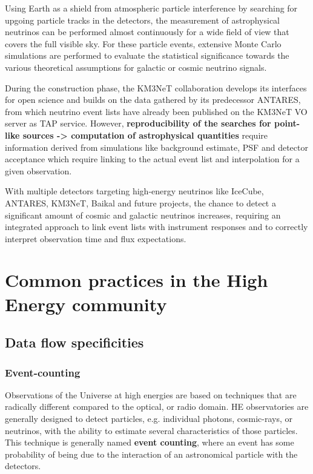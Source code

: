 \documentclass[11pt,a4paper]{ivoa}
\begin{document}
Using Earth as a shield from atmospheric particle interference by searching for upgoing particle tracks in the detectors,
the measurement of astrophysical neutrinos can be performed almost continuously for a wide field of view that covers the
full visible sky. For these particle events, extensive Monte Carlo simulations are performed to evaluate the
statistical significance towards the various theoretical assumptions for galactic or cosmic neutrino signals.

During the construction phase, the KM3NeT collaboration develops its interfaces for open science and builds on the data
gathered by its predecessor ANTARES, from which neutrino event lists have already been published on the KM3NeT VO server
as TAP service. However, {\bf reproducibility of the searches for point-like sources -> computation of astrophysical quantities}
require information derived from  simulations like background estimate, PSF and detector acceptance which require linking
to the actual event list and interpolation for a given observation.

With multiple detectors targeting high-energy neutrinos like IceCube, ANTARES, KM3NeT, Baikal and future projects, the
chance to detect a significant amount of cosmic and galactic neutrinos increases, requiring an integrated approach to
link event lists with instrument responses and to correctly interpret observation time and flux expectations.


\section{Common practices in the High Energy community}

\subsection{Data flow specificities}

\subsubsection{Event-counting}

Observations of the Universe at high energies are based on techniques that are radically different compared to the optical, or radio domain. HE observatories are generally designed to detect particles, e.g. individual photons, cosmic-rays, or neutrinos, with the ability to estimate several characteristics of those particles. This technique is generally named \textbf{event counting}, where an event has some probability of being due to the interaction of an astronomical particle with the detectors.
\end{document}
